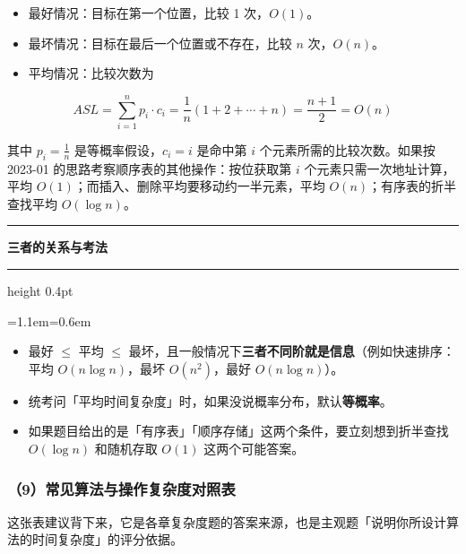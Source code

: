 \documentclass[11pt,openany,UTF8]{ctexbook}
\newcommand{\callouthead}[2]{%
  \par\addvspace{7pt}\noindent
  {\color{#1}\rule[-0.15em]{3pt}{1.05em}}\hspace{0.5em}%
  {\bfseries\color{#1}#2}\par\nobreak\vspace{-0.35em}%
  {\color{rulesep}\hrule height 0.4pt}\nobreak\vspace{0.45em}%
  \begingroup\small\setlength{\parindent}{0pt}%
  \leftskip=1.1em\rightskip=0.6em\noindent\ignorespaces}
\newcommand{\calloutend}{\par\endgroup\addvspace{7pt}}
\newenvironment{callkey}[1]{\callouthead{keybar}{#1}}{\calloutend}
\begin{document}
\begin{itemize}
\item 最好情况：目标在第一个位置，比较 1 次，$O(1)$。
\item 最坏情况：目标在最后一个位置或不存在，比较 $n$ 次，$O(n)$。
\item 平均情况：比较次数为
\end{itemize}
\[ASL = \sum_{i=1}^{n} p_i \cdot c_i = \frac{1}{n}(1+2+\cdots+n)=\frac{n+1}{2}=O(n)\]

其中 $p_i=\frac1n$ 是等概率假设，$c_i=i$ 是命中第 $i$ 个元素所需的比较次数。如果按 2023-01 的思路考察顺序表的其他操作：按位获取第 $i$ 个元素只需一次地址计算，平均 $O(1)$；而插入、删除平均要移动约一半元素，平均 $O(n)$；有序表的折半查找平均 $O(\log n)$。

\begin{callkey}{三者的关系与考法}
\begin{itemize}
\item 最好 $\le$ 平均 $\le$ 最坏，且一般情况下\textbf{三者不同阶就是信息}（例如快速排序：平均 $O(n\log n)$，最坏 $O(n^2)$，最好 $O(n\log n)$）。
\item 统考问「平均时间复杂度」时，如果没说概率分布，默认\textbf{等概率}。
\item 如果题目给出的是「有序表」「顺序存储」这两个条件，要立刻想到折半查找 $O(\log n)$ 和随机存取 $O(1)$ 这两个可能答案。
\end{itemize}
\end{callkey}

\subsubsection{（9）常见算法与操作复杂度对照表}

这张表建议背下来，它是各章复杂度题的答案来源，也是主观题「说明你所设计算法的时间复杂度」的评分依据。
\end{document}

